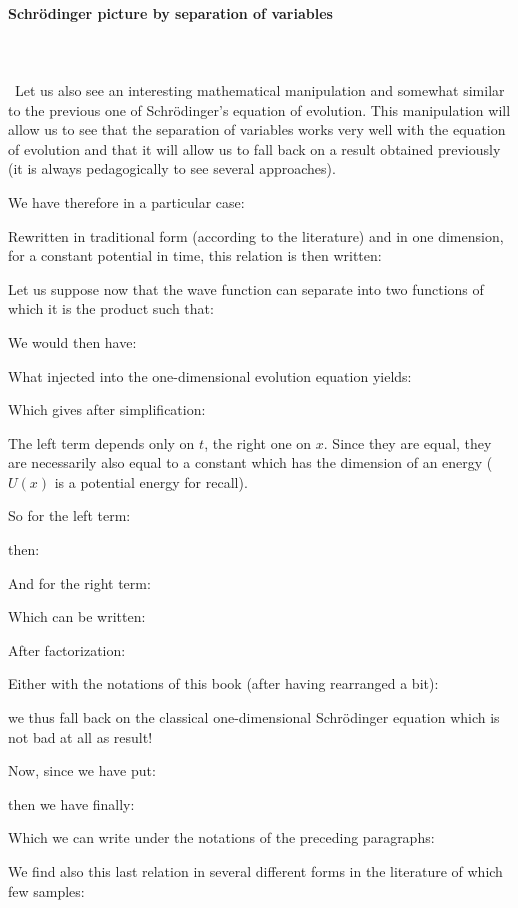 	\paragraph{Schrödinger picture by separation of variables}\mbox{}\\\\\
	Let us also see an interesting mathematical manipulation and somewhat similar to the previous one of Schrödinger's equation of evolution. This manipulation will allow us to see that the separation of variables works very well with the equation of evolution and that it will allow us to fall back on a result obtained previously (it is always pedagogically to see several approaches).

We have therefore in a particular case:
	
	Rewritten in traditional form (according to the literature) and in one dimension, for a constant potential in time, this relation is then written:
	
	Let us suppose now that the wave function can separate into two functions of which it is the product such that:
	
	We would then have:
	
	What injected into the one-dimensional evolution equation yields:
	
	Which gives after simplification:
	
	The left term depends only on $t$, the right one on $x$. Since they are equal, they are necessarily also equal to a constant which has the dimension of an energy ($U(x)$ is a potential energy for recall).

	So for the left term:
	
	then:
	
	And for the right term:
	
	Which can be written:
	
	After factorization:
	
	Either with the notations of this book (after having rearranged a bit):
	
	we thus fall back on the classical one-dimensional Schrödinger  equation which is not bad at all as result!

	Now, since we have put:
	
		then we have finally:
	
	Which we can write under the notations of the preceding paragraphs:
	
	We find also this last relation in several different forms in the literature of which few samples:
	
